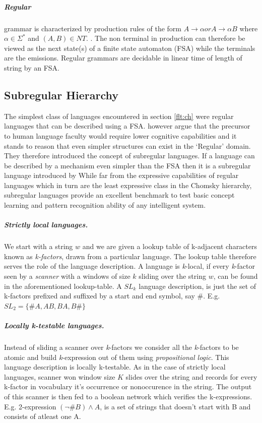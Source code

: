 \subparagraph{Regular}grammar is characterized by production rules of the form $A \rightarrow \alpha or A \rightarrow \alpha B$ where $\alpha \in \Sigma^{*}$ and $(A, B) \in NT$. . The non terminal in production can therefore be viewed as the next state(s) of a finite state automaton (FSA) while the terminals are the emissions. Regular grammars are decidable in linear time of length of string by an FSA.


\subsection{Subregular Hierarchy}\label{flt:sh}
The simplest class of languages encountered in section \ref{flt:ch} were regular languages that can be described using a FSA. \cite{Jager2012} however argue that the precursor to human language faculty would require lower cognitive capabilities and it stands to reason that even simpler structures can exist in the \lq Regular\rq{} domain. They therefore introduced the concept of subregular languages. If a language can be described by a mechanism even simpler than the FSA then it is a subregular language introduced by While far from the expressive capabilities of regular languages which in turn are the least expressive class in the Chomsky hierarchy, subregular languages provide an excellent benchmark to test basic concept learning and pattern recognition ability of any intelligent system.

\subparagraph{Strictly local languages.} We start with a string $w$ and we are given a lookup table of k-adjacent characters known as \textit{k-factors}, drawn from a particular language. The lookup table therefore serves the role of the language description. A language is \textit{k}-local, if every \textit{k}-factor seen by a \textit{scanner} with a windows of size $k$ sliding over the string $w$, can be found in the aforementioned lookup-table. A $SL_k$ language description, is just the set of k-factors prefixed and suffixed by a start and end symbol, say $\#$. E.g. $SL_2 = \{\#A,AB,BA,B\#\}$   

\subparagraph{Locally k-testable languages.} Instead of sliding a scanner over \textit{k}-factors we consider all the \textit{k}-factors to be atomic and build \textit{k}-expression out of them using \textit{propositional logic}. This language description is locally k-testable. As in the case of strictly local languages, scanner won window size $K$ slides over the string and records for every k-factor in vocabulary it's occurrence or nonoccurence in the string. The output of this scanner is then fed to a boolean network which verifies the k-expressions. E.g. 2-expression $(\neg \# B) \wedge A$, is a set of strings that doesn't start with B and consists of atleast one A.


